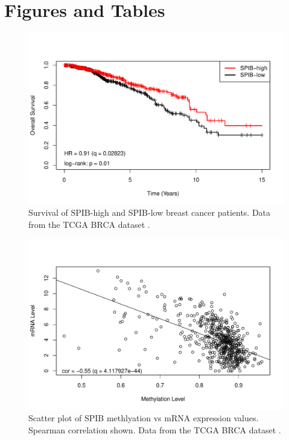 \section{Figures and Tables}

\begin{figure}[h!]
    \centering
    \includegraphics[scale=0.70]{figures/km_plot.pdf}
    \caption{Survival of SPIB-high and SPIB-low breast cancer patients. Data from the TCGA BRCA dataset \cite{Ciriello2015, Goldman2018}.}
    \label{km_plot}
\end{figure} 

\begin{figure}[h!]
    \centering
    \includegraphics[scale=0.75]{figures/methylation.pdf}
    \caption{Scatter plot of SPIB methlyation vs mRNA expression values. Spearman correlation shown. Data from the TCGA BRCA dataset \cite{Ciriello2015, Goldman2018}.}
    \label{methylation}
\end{figure} 

